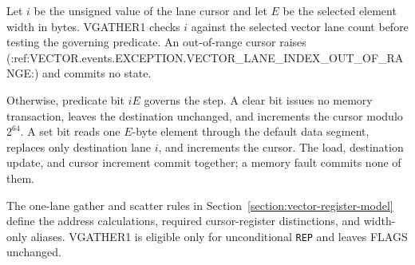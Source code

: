 Let $i$ be the unsigned value of the lane cursor and let $E$ be the selected
element width in bytes.  VGATHER1 checks $i$ against the selected vector lane
count before testing the governing predicate.  An out-of-range cursor raises
(:ref:VECTOR.events.EXCEPTION.VECTOR_LANE_INDEX_OUT_OF_RANGE:) and commits no state.

Otherwise, predicate bit $iE$ governs the step.  A clear bit issues no memory
transaction, leaves the destination unchanged, and increments the cursor
modulo $2^{64}$.  A set bit reads one $E$-byte element through the default data
segment, replaces only destination lane $i$, and increments the cursor.  The
load, destination update, and cursor increment commit together; a memory fault
commits none of them.

The one-lane gather and scatter rules in
Section~\ref{section:vector-register-model} define the address calculations,
required cursor-register distinctions, and width-only aliases.  VGATHER1 is
eligible only for unconditional \texttt{REP} and leaves FLAGS unchanged.
